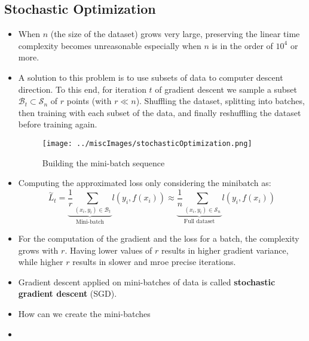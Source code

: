 \documentclass{article}
\newcommand{\tbf}[1]{\textbf{#1}}
\begin{document}
        \subsection{Stochastic Optimization}
        \begin{itemize}
            \item When $n$ (the size of the dataset) grows very large, preserving the linear time complexity becomes unreasonable especially when $n$ is in the order of 
            $10^4$ or more.
            \item A solution to this problem is to use subsets of data to computer descent direction. To this end, for iteration $t$ of gradient descent we sample a subset $\mathcal{B}_t \subset \mathcal{S}_n$ of $r$ points (with $r \ll n$).
            Shuffling the dataset, splitting into batches, then training with each subset of the data, and finally reshuffling the dataset before training again. 
            \begin{figure}[h]
                \centering
                \texttt{[image: ../miscImages/stochasticOptimization.png]} 
                \caption{Building the mini-batch sequence}
                \label{fig:example}
            \end{figure}
            \item Computing the approximated loss only considering the minibatch as:
            \[\overset{\sim}{L}_t = \underbrace{\frac{1}{r} \sum _{(x_i, y_i) \in \mathcal{B}_t}}_{\text{Mini-batch}}l(y_i, f(x_i)) \approx \underbrace{\frac{1}{n} \sum _{(x_i, y_i) \in \mathcal{S}_n}}_{\text{Full dataset}} l(y_i, f(x_i))\]
            \item For the computation of the gradient and the loss for a batch, the complexity grows with $r$. Having lower values of $r$ results in higher gradient variance, while higher $r$ results in slower and mroe precise iterations.
            \item Gradient descent applied on mini-batches of data is called \tbf{stochastic gradient descent} (SGD). 
            \item How can we create the mini-batches
            \item 
        \end{itemize}
\end{document}
